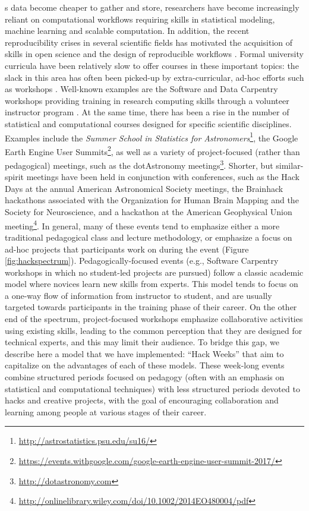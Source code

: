 \label{sec:introduction}
s data become cheaper to gather and store, researchers have become increasingly reliant on computational workflows requiring skills in statistical modeling, machine learning and scalable computation. In addition, the recent reproducibility crises in several scientific fields has motivated the acquisition of skills in open science and the design of reproducible workflows \cite[e.g.][]{pashler2012,baker2016}.
Formal university curricula have been relatively slow to offer courses in these important topics: the slack in this area has often been picked-up by extra-curricular, ad-hoc efforts such as workshops \cite{demasi2017}.
Well-known examples are the Software and Data Carpentry workshops providing training in research computing skills through a volunteer instructor program \cite{b:wilson-swc-lessons-2016,teal2015data}.
At the same time, there has been a rise in the number of statistical and computational courses designed for specific scientific disciplines.
Examples include the \textit{Summer School in Statistics for Astronomers}\footnote{\url{http://astrostatistics.psu.edu/su16/}}, the Google Earth Engine User Summits\footnote{\url{https://events.withgoogle.com/google-earth-engine-user-summit-2017/}}, as well as a variety of project-focused (rather than pedagogical) meetings, such as the dotAstronomy meetings\footnote{\url{http://dotastronomy.com}}.
Shorter, but similar-spirit meetings have been held in conjunction with conferences, such as the Hack Days at the annual American Astronomical Society meetings, the Brainhack hackathons associated with the Organization for Human Brain Mapping and the Society for Neuroscience\cite{Cameron_Craddock2016-wc}, and a hackathon at the American Geophysical Union meeting\footnote{\url{http://onlinelibrary.wiley.com/doi/10.1002/2014EO480004/pdf}}. 
In general, many of these events tend to emphasize either a more traditional pedagogical class and lecture methodology, or emphasize a focus on ad-hoc projects that participants work on during the event (Figure \ref{fig:hackspectrum}).
Pedagogically-focused events (e.g., Software Carpentry workshops \cite{b:wilson-swc-lessons-2016} in which no student-led projects are pursued) follow a classic academic model where novices learn new skills from experts. This model tends to focus on a one-way flow of information from instructor to student, and are usually targeted towards participants in the training phase of their career. On the other end of the spectrum, project-focused workshops emphasize collaborative activities using existing skills, leading to the common perception that they are designed for technical experts, and this may limit their audience.
To bridge this gap, we describe here a model that we have implemented: ``Hack Weeks'' that aim to capitalize on the advantages of each of these models.
These week-long events combine structured periods focused on pedagogy (often with an emphasis on statistical and computational techniques) with less structured periods devoted to hacks and creative projects, with the goal of encouraging collaboration and learning among people at various stages of their career. 

